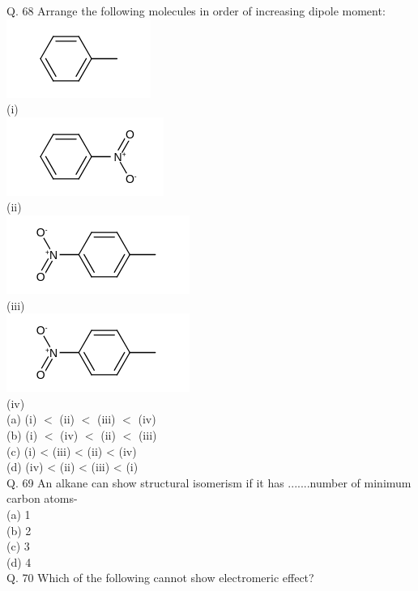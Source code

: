 \documentclass[10pt]{article}
\begin{document}
Q. 68 Arrange the following molecules in order of increasing dipole moment:\\
\includegraphics{smile-85fb0741b9fd28f1a4c275bc299c3a388953c9db}\\
(i)\\
\includegraphics{smile-5432e210698f4386dc6f32bddf2cd9ae8264dd1a}\\
(ii)\\
\includegraphics{smile-b32cd997a9efdf6cb130a90c6fe3a0888752f28f}\\
(iii)\\
\includegraphics{smile-1174cc873e9c3244085aeb4855c05e9e84bc0758}\\
(iv)\\
(a) (i) $<$ (ii) $<$ (iii) $<$ (iv)\\
(b) (i) $<$ (iv) $<$ (ii) $<$ (iii)\\
(c) (i) < (iii) < (ii) < (iv)\\
(d) (iv) < (ii) < (iii) < (i)\\
Q. 69 An alkane can show structural isomerism if it has .......number of minimum carbon atoms-\\
(a) 1\\
(b) 2\\
(c) 3\\
(d) 4\\
Q. 70 Which of the following cannot show electromeric effect?\\
\end{document}
